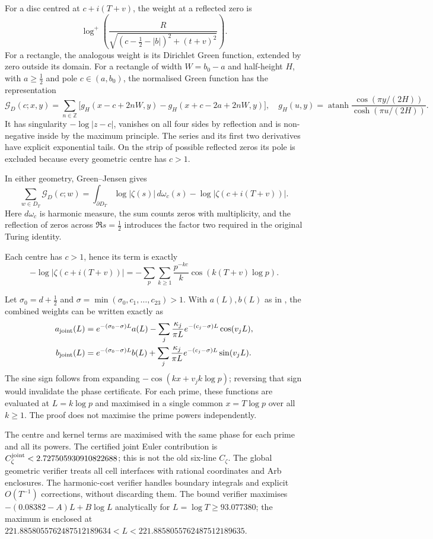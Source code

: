 \documentclass[11pt,reqno]{amsart}
\makeatletter
\let\CG@origeqref\eqref
\newcommand{\CG@gettip}[1]{\@ifundefined{CGTip@#1}{Reference: #1}{\csname CGTip@#1\endcsname}}
\DeclareRobustCommand{\CGeqref}[1]{\pdftooltip{\CG@origeqref{#1}}{\CG@gettip{#1}}}
\numberwithin{equation}{section}
\theoremstyle{definition}
\theoremstyle{remark}
\makeatother
\begin{document}
For a disc centred at $c+i(T+v)$, the weight at a
reflected zero is
\[
\log^+\!\left(\frac{R}{\sqrt{(c-\frac12-|b|)^2+(t+v)^2}}\right).
\]
For a rectangle, the analogous weight is its Dirichlet
Green function, extended by zero outside its domain.
For a rectangle of width $W=b_0-a$ and half-height $H$,
with $a\ge\frac12$ and pole $c\in(a,b_0)$,
the normalised Green function has the representation
\[
\mathcal G_D(c;x,y)=\sum_{n\in\mathbb Z}
\bigl[g_H(x-c+2nW,y)-g_H(x+c-2a+2nW,y)\bigr],
\quad
g_H(u,y)=\operatorname{atanh}
\frac{\cos(\pi y/(2H))}{\cosh(\pi u/(2H))}.
\]
It has singularity $-\log|z-c|$, vanishes on all four sides
by reflection and is non-negative inside by the maximum principle.
The series and its first two derivatives have explicit exponential
tails. On the strip of possible reflected zeros its pole is excluded
because every geometric centre has $c>1$.

In either geometry, Green--Jensen gives
\[
\sum_{w\in D_T}\mathcal G_D(c;w)
=\int_{\partial D_T}\log|\zeta(s)|\,d\omega_c(s)
-\log|\zeta(c+i(T+v))|.
\]
Here $d\omega_c$ is harmonic measure, the sum counts
zeros with multiplicity, and the reflection of zeros
across $\Re s=\frac12$ introduces the factor two
required in the original Turing identity.

Each centre has $c>1$, hence its term is exactly
\[
-\log|\zeta(c+i(T+v))|=
-\sum_p\sum_{k\ge1}\frac{p^{-kc}}{k}
\cos(k(T+v)\log p).
\]

Let $\sigma_0=d+\frac12$ and
$\sigma=\min(\sigma_0,c_1,\ldots,c_{23})>1$.
With $a(L),b(L)$ as in \CGeqref{eq:ab_def},
the combined weights can be written exactly as
\[
\begin{aligned}
a_{\rm joint}(L)
&=e^{-(\sigma_0-\sigma)L}a(L)
-\sum_j\frac{\kappa_j}{\pi L}
 e^{-(c_j-\sigma)L}\cos(v_jL),\\
b_{\rm joint}(L)
&=e^{-(\sigma_0-\sigma)L}b(L)
+\sum_j\frac{\kappa_j}{\pi L}
 e^{-(c_j-\sigma)L}\sin(v_jL).
\end{aligned}
\]
The sine sign follows from expanding
$-\cos(kx+v_jk\log p)$; reversing that sign
would invalidate the phase certificate.
For each prime, these functions are evaluated at
$L=k\log p$ and maximised in a single common
$x=T\log p$ over all $k\ge1$.
The proof does not maximise the prime powers independently.

The centre and kernel terms are maximised with
the same phase for each prime and all its powers.
The certified joint Euler contribution is
$C_\zeta^{\rm joint}<2.727505930910822688$;
this is not the old six-line $C_\zeta$.
The global geometric verifier treats all cell
interfaces with rational coordinates and Arb enclosures.
The harmonic-cost verifier handles boundary integrals
and explicit $O(T^{-1})$ corrections, without
discarding them. The bound verifier maximises
$-(0.08382-A)L+B\log L$ analytically for
$L=\log T\ge93.077380$; the maximum is enclosed at
$221.8858055762487512189634<L<
221.8858055762487512189635$.
\end{document}
